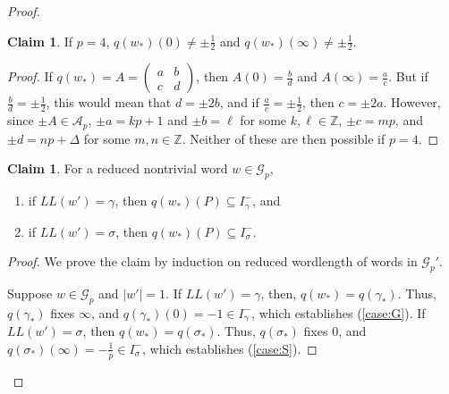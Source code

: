 \documentclass{amsart}     %
\theoremstyle{definition}
\newtheorem{claim}[thm]{Claim}
\begin{document}
\begin{proof}
\begin{claim}  \label{claim:overlap} If $p = 4$,  $q(w_*)(0) \neq \pm \frac{1}{2}$  and $q(w_*)(\infty) \neq \pm \frac{1}{2}$. 
\end{claim}

\begin{proof}
If $q(w_*) = A = \begin{pmatrix} a & b \\ c & d \end{pmatrix}$, then $A(0) = \frac{b}{d}$ and $A(\infty) = \frac{a}{c}$. But if $\frac{b}{d} = \pm \frac{1}{2}$, this would mean that $d = \pm 2b$, and if $\frac{a}{c} = \pm \frac{1}{2}$, then $c = \pm 2a$. However, since $\pm A \in \mathcal{A}_p$, $\pm a = kp + 1$ and $\pm b = \ell$ for some $k, \ell \in \mathbb{Z}$, $\pm c = mp$, and $\pm d = np + \Delta$ for some $m, n \in \mathbb{Z}$. Neither of these are then possible if $p = 4$.
\end{proof}

\begin{claim} \label{claim:images} For a reduced nontrivial word $w \in \mathcal{G}_p$, 
\begin{enumerate}
\item \label{case:G} if $LL(w') = \gamma$, then $q(w_*)(P) \subseteq I_\gamma^-$, and 
\item \label{case:S} if $LL(w') = \sigma$, then $q(w_*)(P) \subseteq I_\sigma^-$.
\end{enumerate}

\end{claim}

\begin{proof} We prove the claim by induction on reduced wordlength of words in $\mathcal{G}_p'$. 

Suppose $w \in \mathcal{G}_p$ and $|w'|= 1$. If $LL(w') = \gamma$, then, $q(w_*) = q(\gamma_*)$. Thus, $q(\gamma_*)$ fixes $\infty$, and $q(\gamma_*)(0) = -1 \in I_\gamma^-$, which establishes (\ref{case:G}). If $LL(w') = \sigma$, then $q(w_*) = q(\sigma_*)$. Thus, $q(\sigma_*)$ fixes $0$, and $q(\sigma_*)(\infty) = -\frac{1}{p} \in I_\sigma^-$, which establishes (\ref{case:S}).


\end{proof}
\end{proof}
\end{document}
